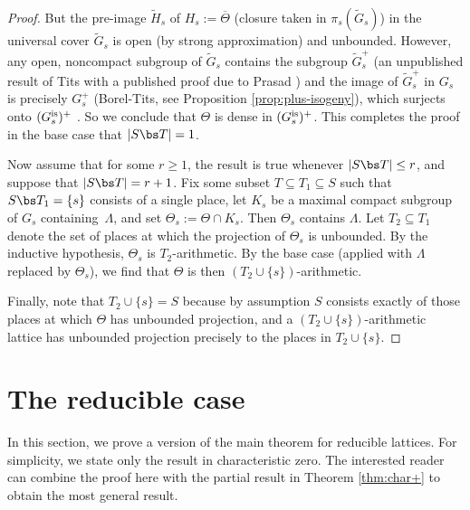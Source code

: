 \begin{proof}
But the pre-image $\widetilde{H}_s$ of $H_s:=\overline{\Theta}$ (closure taken in $\pi_s(\widetilde{G}_s)$) in the universal cover $\widetilde{G}_s$ is open (by strong approximation) and unbounded. However, any open, noncompact subgroup of $\widetilde{G}_s$ contains the subgroup $\widetilde{G}_s^+$ (an unpublished result of Tits with a published proof due to Prasad \cite{prasad-tits}) and the image of $\widetilde{G}_s^+$ in $G_s$ is precisely $G_s^+$ (Borel-Tits, see Proposition \ref{prop:plus-isogeny}), which surjects onto $(G_s^{\textup{is}})^+$ . So we conclude that $\Theta$ is dense in $(G_s^{\textup{is}})^+$. This completes the proof in the base case that $|S\bs T|=1$.

Now assume that for some $r\geq 1$, the result is true whenever $|S\bs T|\leq r$, and suppose that $|S\bs T|=r+1$. Fix some subset $T\subseteq T_1\subseteq S$ such that $S\bs T_1 = \{s\}$ consists of a single place, let $K_s$ be a maximal compact subgroup of $G_s$ containing~$\Lambda$, and set $\Theta_s:=\Theta\cap K_s$. Then $\Theta_s$ contains $\Lambda$. Let $T_2\subseteq T_1$ denote the set of places at which the projection of $\Theta_s$ is unbounded. By the inductive hypothesis, $\Theta_s$ is $T_2$\nobreakdash-arith\-metic. By the base case (applied with $\Lambda$ replaced by $\Theta_s$), we find that $\Theta$ is then $(T_2\cup\{s\})$-arithmetic.

Finally, note that $T_2\cup\{s\}=S$ because by assumption $S$ consists exactly of those places at which $\Theta$ has unbounded projection, and a $(T_2\cup \{s\})$-arithmetic lattice has unbounded projection precisely to the places in $T_2\cup\{s\}$.\end{proof}

\section{The reducible case} \label{sec:reducible}
In this section, we prove a version of the main theorem for reducible lattices. For simplicity, we state only the result in characteristic zero. The interested reader can combine the proof here with the partial result in Theorem \ref{thm:char+} to obtain the most general result.


